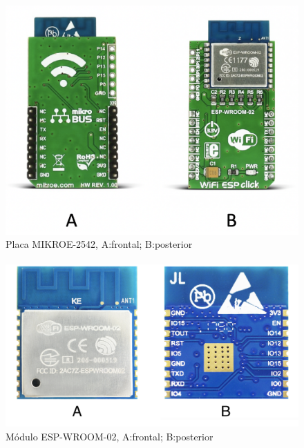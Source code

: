 \begin{figure}[H]
	\centering
	\includegraphics[scale=.4]{Capitulo2/images/mikroe.png}
	\caption{Placa MIKROE-2542, A:frontal; B:posterior}
	\label{fig:diagrama_dispensador}
\end{figure}
\paragraph{}

\begin{figure}[H]
	\centering
	\includegraphics[scale=.2]{Capitulo2/images/wroom.png}
	\caption{Módulo ESP-WROOM-02, A:frontal; B:posterior}
	\label{fig:diagrama_dispensador}
\end{figure}


